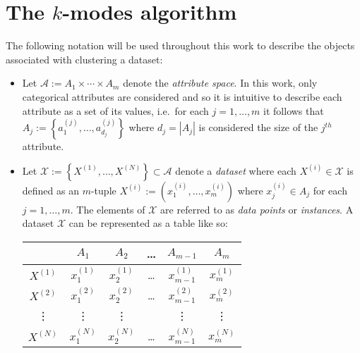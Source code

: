 \section{The \(k\)-modes algorithm}\label{sec:kmodes}

The following notation will be used throughout this work to describe the objects
associated with clustering a dataset:

\begin{itemize}
    \item Let \(\mathcal{A} := A_1 \times \cdots \times A_m\) denote the
        \emph{attribute space}. In this work, only categorical attributes are
        considered and so it is intuitive to describe each attribute as a set of
        its values, i.e.\ for each \(j = 1, \ldots, m\) it follows that \(A_j :=
        \left\{a_1^{(j)}, \ldots, a_{d_j}^{(j)}\right\}\) where \(d_j = |A_j|\)
        is considered the size of the \(j^{th}\) attribute.

    \item Let \(\mathcal{X} := \left\{X^{(1)}, \ldots, X^{(N)}\right\} \subset
        \mathcal{A}\) denote a \emph{dataset} where each \(X^{(i)} \in
        \mathcal{X}\) is defined as an \(m\)-tuple \(X^{(i)} := \left(x_1^{(i)},
        \ldots, x_m^{(i)}\right)\) where \(x_j^{(i)} \in A_j\) for each \(j = 1,
        \ldots, m\). The elements of \(\mathcal{X}\) are referred to as
        \emph{data points} or \emph{instances}. A dataset \(\mathcal{X}\) can be
        represented as a table like so:
        \begin{table}[H]
        \centering
        \begin{tabular}{cccccc}
            {} & \(A_1\) & \(A_2\) & \quad \ldots \quad & \(A_{m-1}\) & \(A_m\)
            \\
            \midrule
            \(X^{(1)}\) & \(x_1^{(1)}\) & \(x_2^{(1)}\) & \quad \ldots \quad & 
            \(x_{m-1}^{(1)}\) & \(x_m^{(1)}\)
            \\
            \(X^{(2)}\) & \(x_1^{(2)}\) & \(x_2^{(2)}\) & \quad \ldots \quad &
            \(x_{m-1}^{(2)}\) & \(x_m^{(2)}\)
            \\
            \vdots & \vdots & \vdots & {} & \vdots & \vdots
            \\
            \(X^{(N)}\) & \(x_1^{(N)}\) & \(x_2^{(N)}\) & \quad \ldots \quad &
            \(x_{m-1}^{(N)}\) & \(x_m^{(N)}\)
        \end{tabular}
        \end{table}


\end{itemize}
